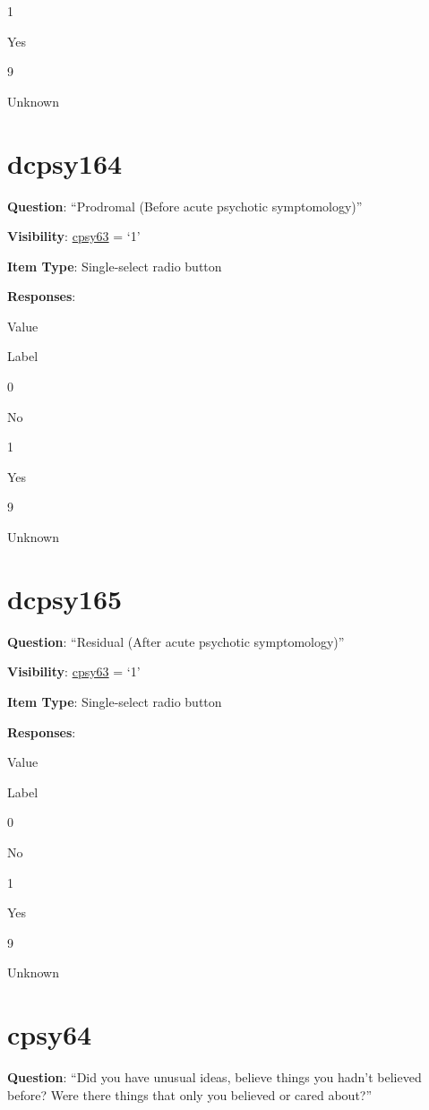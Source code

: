 \documentclass[]{book}
\begin{document}
1

Yes

9

Unknown

\hypertarget{dcpsy164}{%
\section{dcpsy164}\label{dcpsy164}}

\textbf{Question}: ``Prodromal (Before acute psychotic symptomology)''

\textbf{Visibility}: \protect\hyperlink{cpsy63}{cpsy63} = `1'

\textbf{Item Type}: Single-select radio button

\textbf{Responses}:

Value

Label

0

No

1

Yes

9

Unknown

\hypertarget{dcpsy165}{%
\section{dcpsy165}\label{dcpsy165}}

\textbf{Question}: ``Residual (After acute psychotic symptomology)''

\textbf{Visibility}: \protect\hyperlink{cpsy63}{cpsy63} = `1'

\textbf{Item Type}: Single-select radio button

\textbf{Responses}:

Value

Label

0

No

1

Yes

9

Unknown

\hypertarget{cpsy64}{%
\section{cpsy64}\label{cpsy64}}

\textbf{Question}: ``Did you have unusual ideas, believe things you hadn't believed before? Were there things that only you believed or cared about?''
\end{document}
